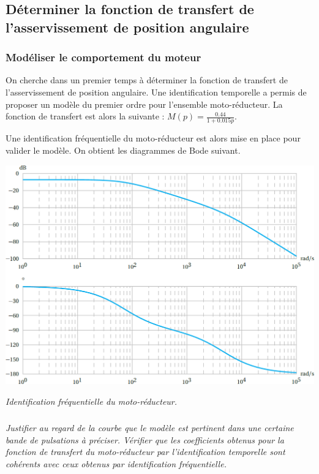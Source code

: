 \documentclass[10pt,fleqn]{article} %
\begin{document}
\subsection{Déterminer la fonction de transfert de l'asservissement de position angulaire}


\subsubsection*{Modéliser le comportement du moteur\\}
		
On cherche dans un premier temps à déterminer la fonction de transfert de l'asservissement de position angulaire. Une identification temporelle a permis de proposer un modèle du premier ordre pour l'ensemble moto-réducteur.  La fonction de transfert est alors la suivante : $M(p)=\frac{\num{0.44}}{1+\num{0.015} p}$.


Une identification fréquentielle du moto-réducteur est alors mise en place pour valider le modèle. On obtient les diagrammes de Bode suivant.

\begin{center}
\includegraphics[width=.6\linewidth]{images2/bode_1}

\textit{Identification fréquentielle du moto-réducteur.}
\end{center}

\subparagraph{}\textit{\label{p02_robot_endo:qdr2} Justifier au regard de la courbe que le modèle est pertinent dans une certaine bande de pulsations à préciser. Vérifier que les coefficients obtenus pour la fonction de transfert du moto-réducteur par l'identification temporelle sont cohérents avec ceux obtenus par identification fréquentielle.}

\end{document}
